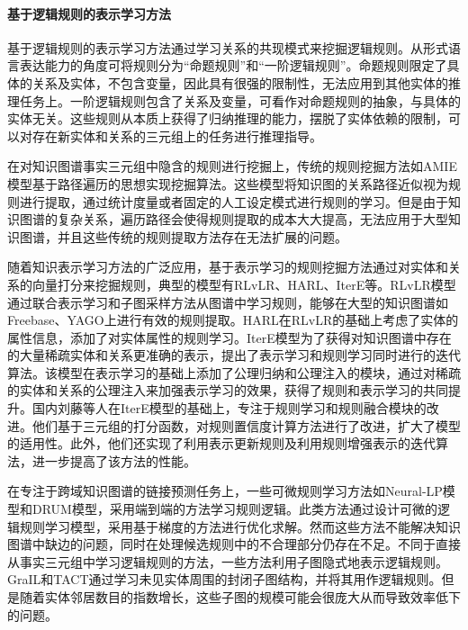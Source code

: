 \paragraph{基于逻辑规则的表示学习方法}
基于逻辑规则的表示学习方法通过学习关系的共现模式来挖掘逻辑规则。从形式语言表达能力的角度可将规则分为“命题规则”和“一阶逻辑规则”\cite{2023-ed}。命题规则限定了具体的关系及实体，不包含变量，因此具有很强的限制性，无法应用到其他实体的推理任务上。一阶逻辑规则包含了关系及变量，可看作对命题规则的抽象，与具体的实体无关。这些规则从本质上获得了归纳推理的能力，摆脱了实体依赖的限制，可以对存在新实体和关系的三元组上的任务进行推理指导。

在对知识图谱事实三元组中隐含的规则进行挖掘上，传统的规则挖掘方法如AMIE\cite{galarraga2013amie}模型基于路径遍历的思想实现挖掘算法。这些模型将知识图的关系路径近似视为规则进行提取，通过统计度量或者固定的人工设定模式进行规则的学习。但是由于知识图谱的复杂关系，遍历路径会使得规则提取的成本大大提高，无法应用于大型知识图谱，并且这些传统的规则提取方法存在无法扩展的问题。

随着知识表示学习方法的广泛应用，基于表示学习的规则挖掘方法通过对实体和关系的向量打分来挖掘规则，典型的模型有RLvLR\cite{omran2018scalable}、HARL\cite{omran2022learning}、IterE\cite{zhang2019iteratively}等。RLvLR模型通过联合表示学习和子图采样方法从图谱中学习规则，能够在大型的知识图谱如Freebase、YAGO上进行有效的规则提取。HARL在RLvLR的基础上考虑了实体的属性信息，添加了对实体属性的规则学习。IterE模型为了获得对知识图谱中存在的大量稀疏实体和关系更准确的表示，提出了表示学习和规则学习同时进行的迭代算法。该模型在表示学习的基础上添加了公理归纳和公理注入的模块，通过对稀疏的实体和关系的公理注入来加强表示学习的效果，获得了规则和表示学习的共同提升。国内刘藤\cite{2021-qx}等人在IterE模型的基础上，专注于规则学习和规则融合模块的改进。他们基于三元组的打分函数，对规则置信度计算方法进行了改进，扩大了模型的适用性。此外，他们还实现了利用表示更新规则及利用规则增强表示的迭代算法，进一步提高了该方法的性能。

在专注于跨域知识图谱的链接预测任务上，一些可微规则学习方法如Neural-LP\cite{yang2017differentiable}模型和DRUM\cite{sadeghian2019drum}模型，采用端到端的方法学习规则逻辑。此类方法通过设计可微的逻辑规则学习模型，采用基于梯度的方法进行优化求解。然而这些方法不能解决知识图谱中缺边的问题，同时在处理候选规则中的不合理部分仍存在不足。不同于直接从事实三元组中学习逻辑规则的方法，一些方法利用子图隐式地表示逻辑规则。GraIL\cite{teru2020inductive}和TACT\cite{chen2021topology}通过学习未见实体周围的封闭子图结构，并将其用作逻辑规则。但是随着实体邻居数目的指数增长，这些子图的规模可能会很庞大从而导致效率低下的问题。

